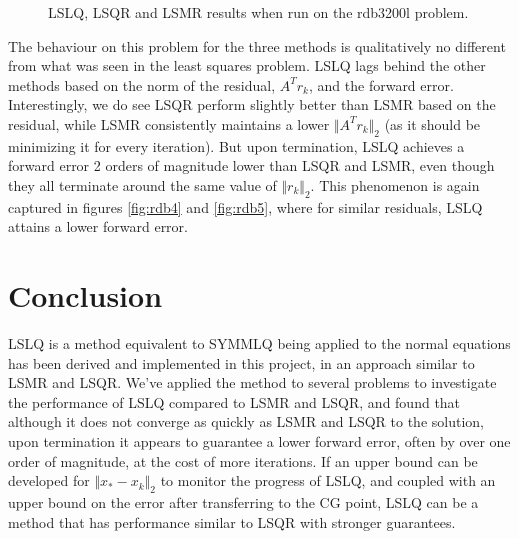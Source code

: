 \documentclass[11pt]{article}
\begin{document}
\begin{figure}[ht]
	
	\caption{LSLQ, LSQR and LSMR results when run on the rdb3200l problem.}
\end{figure}

The behaviour on this problem for the three methods is qualitatively no different from what was seen in the least squares problem. LSLQ lags behind the other methods based on the norm of the residual, $A^T r_k$, and the forward error. Interestingly, we do see LSQR perform slightly better than LSMR based on the residual, while LSMR consistently maintains a lower $\Vert A^T r_k \Vert_2$ (as it should be minimizing it for every iteration). But upon termination, LSLQ achieves a forward error 2 orders of magnitude lower than LSQR and LSMR, even though they all terminate around the same value of $\Vert r_k \Vert_2$. This phenomenon is again captured in figures \ref{fig:rdb4} and \ref{fig:rdb5}, where for similar residuals, LSLQ attains a lower forward error.

\section{Conclusion}
LSLQ is a method equivalent to SYMMLQ being applied to the normal equations has been derived and implemented in this project, in an approach similar to LSMR and LSQR. We've applied the method to several problems to investigate the performance of LSLQ compared to LSMR and LSQR, and found that although it does not converge as quickly as LSMR and LSQR to the solution, upon termination it appears to guarantee a lower forward error, often by over one order of magnitude, at the cost of more iterations. If an upper bound can be developed for $\Vert x_* - x_k \Vert_2$ to monitor the progress of LSLQ, and coupled with an upper bound on the error after transferring to the CG point, LSLQ can be a method that has performance similar to LSQR with stronger guarantees.
\end{document}
